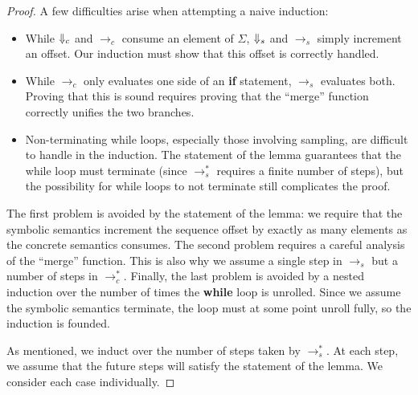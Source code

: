 \begin{proof}
  A few difficulties arise when attempting a naive induction:

  \begin{itemize}
  \item While $\Downarrow_c$ and $\to_c$ consume an element of $\Sigma$,
    $\Downarrow_s$ and $\to_s$ simply increment an offset. Our induction
    must show that this offset is correctly handled.
  \item While $\to_c$ only evaluates one side of an \textbf{if}
    statement, $\to_s$ evaluates both.  Proving that this is sound
    requires proving that the ``merge'' function correctly unifies the
    two branches.
  \item Non-terminating while loops, especially those involving
    sampling, are difficult to handle in the induction.  The statement
    of the lemma guarantees that the while loop must terminate (since
    $\to_s^*$ requires a finite number of steps), but the possibility
    for while loops to not terminate still complicates the proof.
  \end{itemize}
   
  The first problem is avoided by the statement of the lemma: we
  require that the symbolic semantics increment the sequence offset by
  exactly as many elements as the concrete semantics consumes.  The
  second problem requires a careful analysis of the ``merge''
  function.  This is also why we assume a single step in $\to_s$ but a
  number of steps in $\to_c^*$.  Finally, the last problem is avoided
  by a nested induction over the number of times the \textbf{while}
  loop is unrolled.  Since we assume the symbolic semantics terminate,
  the loop must at some point unroll fully, so the induction is
  founded.

  As mentioned, we induct over the number of steps taken by $\to_s^*$.
  At each step, we assume that the future steps will satisfy the
  statement of the lemma.  We consider each case individually.


\end{proof}
